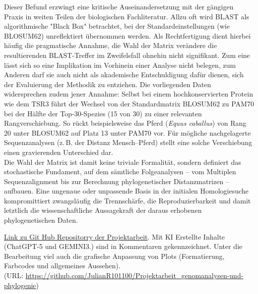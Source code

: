\documentclass[11pt, a4paper]{article}
\begin{document}
Dieser Befund erzwingt eine kritische Auseinandersetzung mit der gängigen Praxis in weiten Teilen der biologischen Fachliteratur. Allzu oft wird BLAST als algorithmische "Black Box" betrachtet, bei der Standardeinstellungen (wie BLOSUM62) unreflektiert übernommen werden. Als Rechtfertigung dient hierbei häufig die pragmatische Annahme, die Wahl der Matrix verändere die resultierenden BLAST-Treffer im Zweifelsfall ohnehin nicht signifikant. Zum eine lässt sich so eine Implikation im Vorhinein einer Analyse nicht belegen, zum Anderen darf sie auch nicht als akademische Entschuldigung dafür dienen, sich der Evaluierung der Methodik zu entziehen. Die vorliegenden Daten widersprechen zudem jener Annahme: Selbst bei einem hochkonservierten Protein wie dem TSR3 führt der Wechsel von der Standardmatrix BLOSUM62 zu PAM70 bei der Hälfte der Top-30-Spezies (15 von 30) zu einer relevanten Rangverschiebung. So rückt beispielsweise das Pferd (\textit{Equus caballus}) von Rang 20 unter BLOSUM62 auf Platz 13 unter PAM70 vor. Für mögliche nachgelagerte Sequenzanalysen (z.\,B. der Distanz Mensch--Pferd) stellt eine solche Verschiebung einen gravierenden Unterschied dar. \\
Die Wahl der Matrix ist damit keine triviale Formalität, sondern definiert das stochastische Fundament, auf dem sämtliche Folgeanalysen -- vom Multiplen Sequenzalignment bis zur Berechnung phylogenetischer Distanzmatrizen -- aufbauen. Eine ungenaue oder unpassende Basis in der initialen Homologiesuche kompromittiert zwangsläufig die Trennschärfe, die Reproduzierbarkeit und damit letztlich die wissenschaftliche Aussagekraft der daraus erhobenen phylogenetischen Daten.

\vspace{50}

\href{https://github.com/JulianR101100/Projektarbeit_genomanalysen-und-phylogenie}{Link zu Git Hub Repositorry der Projektarbeit}. Mit KI Erstellte Inhalte (ChatGPT-5 und GEMINI3.) sind in Kommentaren gekennzeichnet. Unter die Bearbeitung viel auch die grafische Anpassung von Plots (Formatierung, Farbcodes und allgemeines Aussehen). \\
(URL: \url{https://github.com/JulianR101100/Projektarbeit_genomanalysen-und-phylogenie})
\end{document}
